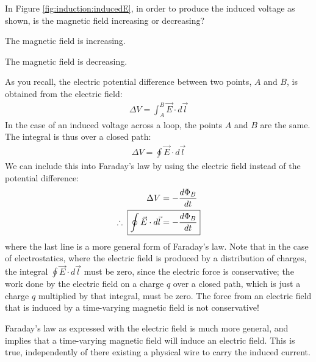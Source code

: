 \begin{checkpoint}{}
	\begin{MCquestion}{In Figure \ref{fig:induction:inducedE}, in order to produce the induced voltage as shown, is the magnetic field increasing or decreasing?}
		\item The magnetic field is increasing.
		\item The magnetic field is decreasing. \correct
	\end{MCquestion}
\end{checkpoint}
As you recall, the electric potential difference between two points, $A$ and $B$, is obtained from the electric field:
\begin{align*}
\Delta V = \int_A^B \vec E\cdot d\vec l
\end{align*}
In the case of an induced voltage across a loop, the points $A$ and $B$ are the same. The integral is thus over a closed path:
\begin{align*}
\Delta V = \oint \vec E\cdot d\vec l
\end{align*}
We can include this into Faraday's law by using the electric field instead of the potential difference:
\begin{align*}
\Delta V &=-\frac{d\Phi_B}{dt}\\
\therefore \;\;\Aboxed{\oint \vec E\cdot d\vec l &= -\frac{d\Phi_B}{dt}}
\end{align*}
where the last line is a more general form of Faraday's law. Note that in the case of electrostatics, where the electric field is produced by a distribution of charges, the integral $\oint \vec E\cdot d\vec l$ must be zero, since the electric force is conservative; the work done by the electric field on a charge $q$ over a closed path, which is just a charge $q$ multiplied by that integral, must be zero. The force from an electric field that is induced by a time-varying magnetic field is not conservative!

Faraday's law as expressed with the electric field is much more general, and implies that a time-varying magnetic field will induce an electric field. This is true, independently of there existing a physical wire to carry the induced current. 

